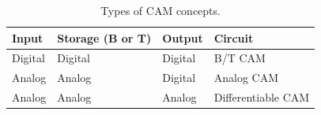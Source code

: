 \begin{table}[b]
\caption{Types of CAM concepts.}
\label{tab_cam_concepts}
\centering
\begin{tabular}{|l|l|l|l|}
\hline
\textbf{Input} & \textbf{Storage (B or T)} & \textbf{Output} & \textbf{Circuit} \\ \hline
Digital & Digital & Digital & B/T CAM \cite{SRAM_5} \\ \hline
Analog & Analog & Digital & Analog CAM \cite{ReRAM_5} \\ \hline
Analog & Analog & Analog & Differentiable CAM \cite{types_dcam} \\ \hline
\end{tabular}
\end{table}

